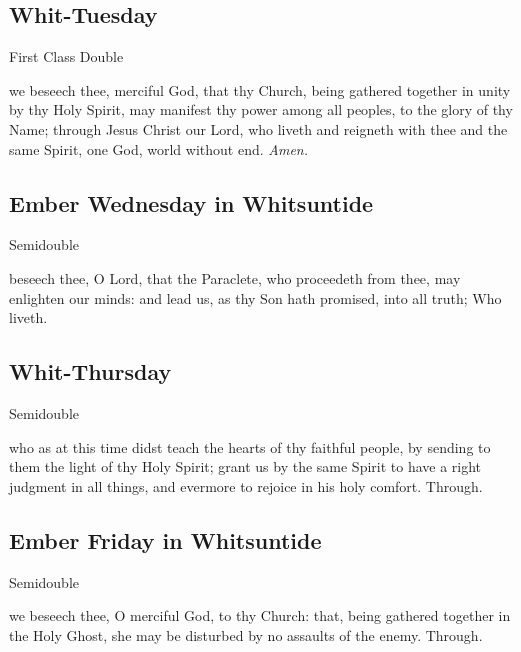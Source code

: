 \subsection{Whit-Tuesday}
\begin{inhead}
    {First Class Double}
\end{inhead}

\collect
{} we beseech thee, merciful God, that thy Church, being gathered together in unity by thy Holy Spirit, may manifest thy power among all peoples, to the glory of thy Name; through Jesus Christ our Lord, who liveth and reigneth with thee and the same Spirit, one God, world without end. \textit{Amen.}


\subsection{Ember Wednesday in Whitsuntide}
\begin{inhead}
    {Semidouble}
\end{inhead}

\collect
{} beseech thee, O Lord, that the Paraclete, who proceedeth from thee, may enlighten our minds: and lead us, as thy Son hath promised, into all truth; Who liveth.


\subsection{Whit-Thursday}
\begin{inhead}
    {Semidouble}
\end{inhead}
\fancyhead[RE,LO]{}

\collect
{} who as at this time didst teach the hearts of thy faithful people, by sending to them the light of thy Holy Spirit; grant us by the same Spirit to have a right judgment in all things, and evermore to rejoice in his holy comfort. Through.


\subsection{Ember Friday in Whitsuntide}
\begin{inhead}
    {Semidouble}
\end{inhead}

\collect
{} we beseech thee, O merciful God, to thy Church: that, being gathered together in the Holy Ghost, she may be disturbed by no assaults of the enemy. Through.

